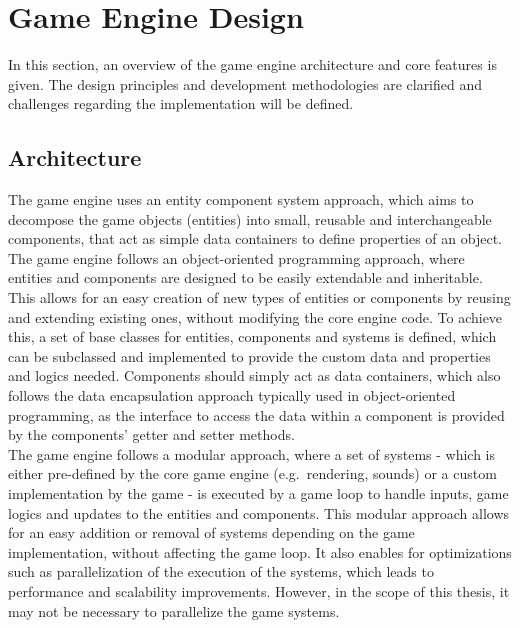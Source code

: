 \section{Game Engine Design}\label{sec:game-engine-design}
In this section, an overview of the game engine architecture and core features is given.
The design principles and development methodologies are clarified and challenges regarding the implementation will be defined.

\subsection{Architecture}\label{subsec:architecture}
The game engine uses an entity component system approach, which aims to decompose the game objects (entities) into small, reusable and interchangeable
components, that act as simple data containers to define properties of an object.
The game engine follows an object-oriented programming approach, where entities and components are designed to be easily extendable and inheritable.
This allows for an easy creation of new types of entities or components by reusing and extending existing ones, without modifying the core engine code.
To achieve this, a set of base classes for entities, components and systems is defined, which can be subclassed and implemented to provide the custom data and
properties and logics needed.
Components should simply act as data containers, which also follows the data encapsulation approach typically used in object-oriented programming, as
the interface to access the data within a component is provided by the components' getter and setter methods.
\\
The game engine follows a modular approach, where a set of systems - which is either pre-defined by the core game engine (e.g.\ rendering, sounds) or
a custom implementation by the game - is executed by a game loop to handle inputs, game logics and updates to the entities and components.
This modular approach allows for an easy addition or removal of systems depending on the game implementation, without affecting the game loop.
It also enables for optimizations such as parallelization of the execution of the systems, which leads to performance and scalability improvements.
However, in the scope of this thesis, it may not be necessary to parallelize the game systems.

